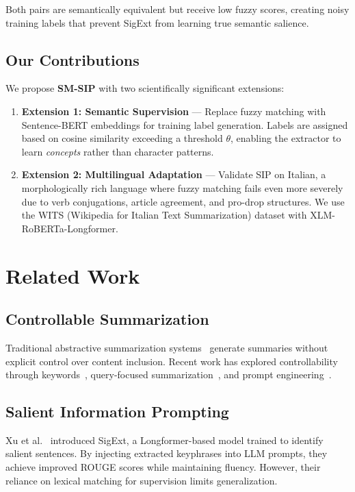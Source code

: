 \documentclass[conference]{IEEEtran}
\begin{document}
Both pairs are semantically equivalent but receive low fuzzy scores, creating noisy training labels that prevent SigExt from learning true semantic salience.

\subsection{Our Contributions}

We propose \textbf{SM-SIP} with two scientifically significant extensions:

\begin{enumerate}
    \item \textbf{Extension 1: Semantic Supervision} --- Replace fuzzy matching with Sentence-BERT embeddings for training label generation. Labels are assigned based on cosine similarity exceeding a threshold $\theta$, enabling the extractor to learn \textit{concepts} rather than character patterns.
    
    \item \textbf{Extension 2: Multilingual Adaptation} --- Validate SIP on Italian, a morphologically rich language where fuzzy matching fails even more severely due to verb conjugations, article agreement, and pro-drop structures. We use the WITS (Wikipedia for Italian Text Summarization) dataset with XLM-RoBERTa-Longformer.
\end{enumerate}

\section{Related Work}

\subsection{Controllable Summarization}
Traditional abstractive summarization systems~\cite{lewis2020bart, zhang2020pegasus} generate summaries without explicit control over content inclusion. Recent work has explored controllability through keywords~\cite{he2022ctrlsum}, query-focused summarization~\cite{xu2020query}, and prompt engineering~\cite{goyal2022news}.

\subsection{Salient Information Prompting}
Xu et al.~\cite{xu2024sip} introduced SigExt, a Longformer-based model trained to identify salient sentences. By injecting extracted keyphrases into LLM prompts, they achieve improved ROUGE scores while maintaining fluency. However, their reliance on lexical matching for supervision limits generalization.
\end{document}

